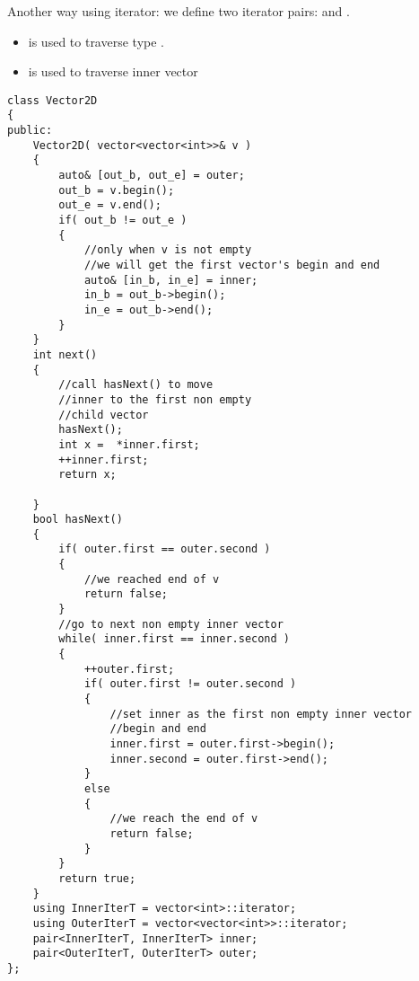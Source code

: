 Another way using iterator: we define two iterator pairs:  and .

\begin{itemize}
\item {} is used to traverse type .
\item {} is used to traverse inner vector
\end{itemize}

\begin{lstlisting}[style=customc, caption={Two Iterators}]
class Vector2D
{
public:
    Vector2D( vector<vector<int>>& v )
    {
        auto& [out_b, out_e] = outer;
        out_b = v.begin();
        out_e = v.end();
        if( out_b != out_e )
        {
            //only when v is not empty
            //we will get the first vector's begin and end
            auto& [in_b, in_e] = inner;
            in_b = out_b->begin();
            in_e = out_b->end();
        }
    }
    int next()
    {
        //call hasNext() to move
        //inner to the first non empty
        //child vector
        hasNext();
        int x =  *inner.first;
        ++inner.first;
        return x;

    }
    bool hasNext()
    {
        if( outer.first == outer.second )
        {
            //we reached end of v
            return false;
        }
        //go to next non empty inner vector
        while( inner.first == inner.second )
        {
            ++outer.first;
            if( outer.first != outer.second )
            {
                //set inner as the first non empty inner vector
                //begin and end
                inner.first = outer.first->begin();
                inner.second = outer.first->end();
            }
            else
            {
                //we reach the end of v
                return false;
            }
        }
        return true;
    }
    using InnerIterT = vector<int>::iterator;
    using OuterIterT = vector<vector<int>>::iterator;
    pair<InnerIterT, InnerIterT> inner;
    pair<OuterIterT, OuterIterT> outer;
};
\end{lstlisting}